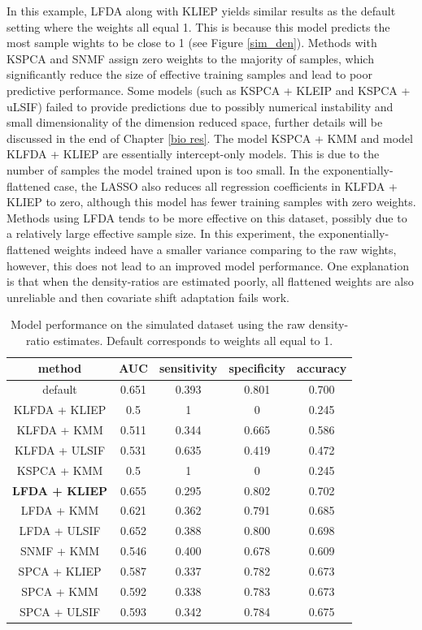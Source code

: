 \documentclass[a4paper,12pt]{article}
\begin{document}
In this example, LFDA along with KLIEP yields similar results as the default setting where the weights all equal 1. This is because this model predicts the most sample wights to be close to 1 (see Figure \ref{sim_den}). Methods with KSPCA and SNMF assign zero weights to the majority of samples, which significantly reduce the size of effective training samples and lead to poor predictive performance. Some models (such as KSPCA + KLEIP and KSPCA + uLSIF) failed to provide predictions due to possibly numerical instability and small dimensionality of the dimension reduced space, further details will be discussed in the end of Chapter \ref{bio res}. The model KSPCA + KMM and model KLFDA + KLIEP are essentially intercept-only models. This is due to the number of samples the model trained upon is too small. In the exponentially-flattened case, the LASSO also reduces all regression coefficients in KLFDA + KLIEP to zero, although this model has fewer training samples with zero weights. Methods using LFDA tends to be more effective on this dataset, possibly due to a relatively large effective sample size. In this experiment, the exponentially-flattened weights indeed have a smaller variance comparing to the raw wights, however, this does not lead to an improved model performance. One explanation is that when the density-ratios are estimated poorly, all flattened weights are also unreliable and then covariate shift adaptation fails work.

 \begin{table}[H]
	\centering
\begin{tabular} {c | c | c | c | c }
method & AUC & sensitivity & specificity & accuracy  \\
\hline \hline
 default & 0.651 & 0.393 & 0.801 & 0.700 \\
 KLFDA + KLIEP& 0.5 & 1 & 0 & 0.245 \\
 KLFDA + KMM & 0.511 & 0.344 & 0.665 & 0.586 \\
 KLFDA + ULSIF& 0.531 & 0.635 & 0.419 & 0.472 \\
 KSPCA + KMM & 0.5 & 1 & 0 & 0.245 \\
 \textbf{LFDA + KLIEP} & 0.655 & 0.295 & 0.802 & 0.702 \\
 LFDA + KMM & 0.621 & 0.362 & 0.791 & 0.685  \\
 LFDA + ULSIF & 0.652 & 0.388 & 0.800 & 0.698 \\
 SNMF + KMM & 0.546 & 0.400 & 0.678 & 0.609 \\
 SPCA + KLIEP & 0.587  & 0.337 & 0.782 & 0.673 \\
 SPCA + KMM & 0.592  & 0.338 & 0.783 & 0.673 \\
 SPCA + ULSIF & 0.593 & 0.342 & 0.784 & 0.675 \\
\hline \hline
\end{tabular}	
\caption{Model performance on the simulated dataset using the raw density-ratio estimates. Default corresponds to weights all equal to 1.}
\label{simulated data res}
\end{table}
\end{document}
